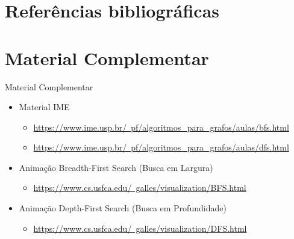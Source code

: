 \documentclass[aspectratio=169]{beamer}
\begin{document}
\section{Referências bibliográficas}

\section{Material Complementar}

\begin{frame}{Material Complementar}
   \begin{itemize}
	\item Material IME
	\begin{itemize}
   \item \href{https://www.ime.usp.br/~pf/algoritmos_para_grafos/aulas/bfs.html}{https://www.ime.usp.br/~pf/algoritmos\_para\_grafos/aulas/bfs.html}      
   \item \href{https://www.ime.usp.br/~pf/algoritmos_para_grafos/aulas/dfs.html}{https://www.ime.usp.br/~pf/algoritmos\_para\_grafos/aulas/dfs.html}   	
	\end{itemize}		
   \item Animação Breadth-First Search (Busca em Largura)
   \begin{itemize}
   \item \href{https://www.cs.usfca.edu/~galles/visualization/BFS.html}{https://www.cs.usfca.edu/~galles/visualization/BFS.html}   
   \end{itemize}
   \item Animação Depth-First Search (Busca em Profundidade)
   \begin{itemize}
   \item \href{https://www.cs.usfca.edu/~galles/visualization/DFS.html}{https://www.cs.usfca.edu/~galles/visualization/DFS.html}   
   \end{itemize}
   \end{itemize}
\end{frame}    
\end{document}
